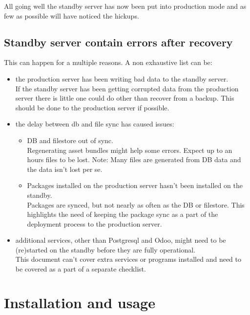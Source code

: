 \documentclass[a4paper]{article}
\begin{document}
	All going well the standby server has now been put into production mode and as few as possible will have noticed the hickups.

\subsection{Standby server contain errors after recovery}
	This can happen for a multiple reasons. A non exhaustive list can be:
	\begin{itemize}
		\item the production server has been writing bad data to the standby server.\\
				If the standby server has been getting corrupted data from the production server there is little one could do other than recover from a backup. This should be done to the production server if possible.
		\item the delay between db and file sync has caused issues:
		\begin{itemize}
			\item DB and filestore out of sync.\\
				Regenerating asset bundles might help some errors. Expect up to an hours files to be lost. Note: Many files are generated from DB data and the data isn't lost per se.
			\item Packages installed on the production server hasn't been installed on the standby.\\Packages are synced, but not  nearly as often as the DB or filestore. This highlights the need of keeping the package sync as a part of the deployment process to the production server.
		\end{itemize}
		\item additional services, other than Postgresql and Odoo, might need to be (re)started on the standby before they are fully operational.\\
			This document can't cover extra services or programs installed and need to be covered as a part of a separate checklist. 
	\end{itemize}

\newpage
\section{Installation and usage}
	
\end{document}

